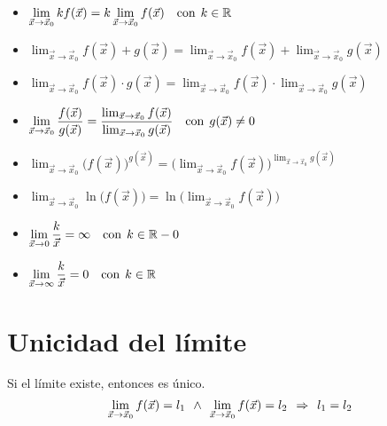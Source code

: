 \begin{itemize}
\item $\displaystyle\lim_{\Vec{x} \to \Vec{x}_0} k f(\Vec{x}) = k \displaystyle\lim_{\Vec{x} \to \Vec{x}_0} f(\Vec{x}) \quad \textrm{con} \hspace{1ex} k \in \mathbb{R}$

\item $\displaystyle\lim_{\Vec{x} \to \Vec{x}_0} f(\Vec{x})+g(\Vec{x})=\displaystyle\lim_{\Vec{x} \to \Vec{x}_0} f(\Vec{x}) + \displaystyle\lim_{\Vec{x} \to \Vec{x}_0} g(\Vec{x})$

\item $\displaystyle\lim_{\Vec{x} \to \Vec{x}_0} f(\Vec{x}) \cdot g(\Vec{x})=\displaystyle\lim_{\Vec{x} \to \Vec{x}_0} f(\Vec{x}) \cdot \displaystyle\lim_{\Vec{x} \to \Vec{x}_0} g(\Vec{x})$

\item $\displaystyle\lim_{\Vec{x} \to \Vec{x}_0} \dfrac{f(\Vec{x})}{g(\Vec{x})} = \dfrac{\lim_{\Vec{x} \to \Vec{x}_0} f(\Vec{x})}{\lim_{\Vec{x} \to \Vec{x}_0} g(\Vec{x})} \quad \textrm{con} \hspace{1ex} g(\Vec{x}) \neq 0$

\item $\displaystyle\lim_{\Vec{x} \to \Vec{x}_0} \Big( f(\Vec{x}) \Big)^{g(\Vec{x})}= \Big( \displaystyle\lim_{\Vec{x} \to \Vec{x}_0} f(\Vec{x}) \Big)^{\lim_{\Vec{x} \to \Vec{x}_0} g(\Vec{x})}$

\item $\displaystyle\lim_{\Vec{x} \to \Vec{x}_0} \ln{\Big( f(\Vec{x}) \Big)} = \ln{\Big( \displaystyle\lim_{\Vec{x} \to \Vec{x}_0} f(\Vec{x}) \Big)}$

\item $\displaystyle\lim_{\Vec{x} \to 0} \dfrac{k}{\Vec{x}} = \infty \quad \textrm{con} \hspace{1ex} k \in \mathbb{R}-0$

\item $\displaystyle\lim_{\Vec{x} \to \infty} \dfrac{k}{\Vec{x}} = 0 \quad \textrm{con} \hspace{1ex} k \in \mathbb{R}$

\end{itemize}


\section{Unicidad del límite}

\begin{mdframed}[style=PropertyFrame]
    \begin{prop}
    \end{prop}
    Si el límite existe, entonces es único.
    \begin{equation*}
        \lim_{\Vec{x} \to \Vec{x}_0} f(\Vec{x}) = l_1  \hspace{1ex} \land \hspace{1ex} \lim_{\Vec{x} \to \Vec{x}_0} f(\Vec{x}) = l_2 \hspace{1ex} \Rightarrow \hspace{1ex} l_1=l_2
    \end{equation*}
\end{mdframed}

